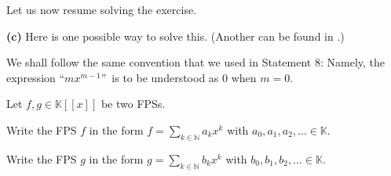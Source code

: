 \documentclass[paper=a4, fontsize=12pt]{scrartcl}%
\let\sumnonlimits\sum
\renewcommand{\sum}{\sumnonlimits\limits}
\theoremstyle{plainsl}
\theoremstyle{definition}
\theoremstyle{remark}
\begin{document}
\bigskip

Let us now resume solving the exercise.

\bigskip

\textbf{(c)} Here is one possible way to solve this. (Another can be found in
\cite[proof of Proposition 0.2 \textbf{(c)}]{Grinbe18}.)

We shall follow the same convention that we used in Statement 8: Namely, the
expression \textquotedblleft$mx^{m-1}$\textquotedblright\ is to be understood
as $0$ when $m=0$.

Let $f,g\in\mathbb{K}\left[  \left[  x\right]  \right]  $ be two FPSs.

Write the FPS $f$ in the form $f=\sum_{k\in\mathbb{N}}a_{k}x^{k}$ with
$a_{0},a_{1},a_{2},\ldots\in\mathbb{K}$.

Write the FPS $g$ in the form $g=\sum_{k\in\mathbb{N}}b_{k}x^{k}$ with
$b_{0},b_{1},b_{2},\ldots\in\mathbb{K}$.
\end{document}
